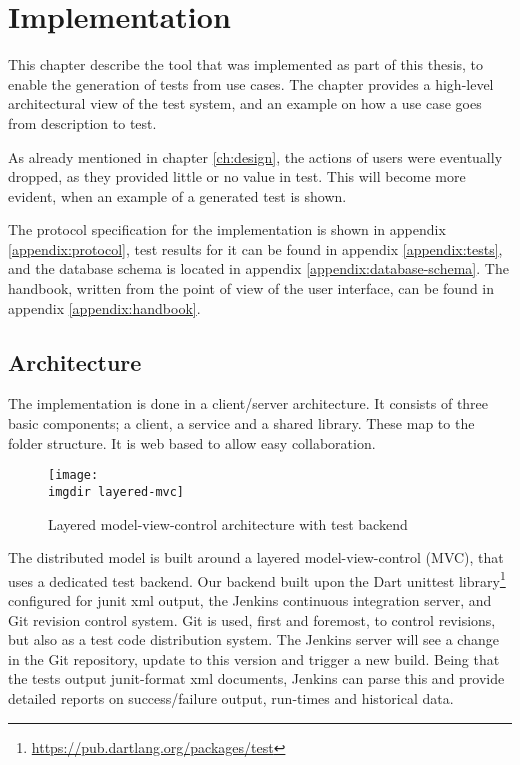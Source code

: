 \chapter{Implementation}
\label{chapter:implementation}
This chapter describe the tool that was implemented as part of this thesis, to enable the generation of tests from use cases. The chapter provides a high-level architectural view of the test system, and an example on how a use case goes from description to test.\medskip

\noindent As already mentioned in chapter \ref{ch:design}, the actions of users were eventually dropped, as they provided little or no value in test. This will become more evident, when an example of a generated test is shown.\medskip

\noindent The protocol specification for the implementation is shown in appendix \ref{appendix:protocol}, test results for it can be found in appendix \ref{appendix:tests}, and the database schema is located in appendix \ref{appendix:database-schema}. The handbook, written from the point of view of the user interface, can be found in appendix \ref{appendix:handbook}.

\section{Architecture}
The implementation is done in a client/server architecture. It consists of three basic components; a client, a service and a shared library. These map to the folder structure. It is web based to allow easy collaboration.\medskip
\begin{figure}[!htbp]
  \centering
  \texttt{[image: \\imgdir layered-mvc]}
  \caption{Layered model-view-control architecture with test backend}
  \label{fig:layered-mvc}
\end{figure}
\noindent The distributed model is built around a layered model-view-control (MVC), that uses a dedicated test backend. Our backend built upon the Dart unittest library\footnote{\url{https://pub.dartlang.org/packages/test}} configured for junit xml output, the Jenkins continuous integration server, and Git revision control system. Git is used, first and foremost, to control revisions, but also as a test code distribution system. The Jenkins server will see a change in the Git repository, update to this version and trigger a new build. Being that the tests output junit-format xml documents, Jenkins can parse this and provide detailed reports on success/failure output, run-times and historical data.\medskip

